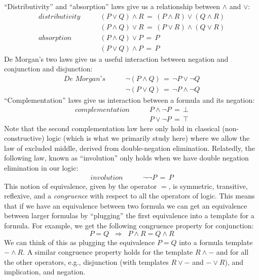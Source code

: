\noindent
``Distributivity'' and ``absorption'' laws give us a relationship
between $\wedge$ and $\vee$:
%
\begin{align*}
\textit{distributivity} \qquad & (P \vee Q) \wedge R \, = \, (P \wedge R) \vee (Q \wedge R) \\
 & (P \wedge Q) \vee R \, = \, (P \vee R) \wedge (Q
                                               \vee R) \\
  \textit{absorption} \qquad & (P \wedge Q) \vee P \, = \, P \\
   & (P \vee Q) \wedge P \, = \, P
\end{align*}
%
De Morgan's two laws give us a useful interaction between negation and
conjunction and disjunction:
%
\begin{align*}
\textit{De Morgan's} \qquad & \neg (P \wedge Q) \, = \, \neg P \vee \neg Q \\
& \neg (P \vee Q) \, = \, \neg P \wedge \neg Q
\end{align*}
%
``Complementation'' laws give us interaction between a formula and its
negation:
%
\begin{align*}
  \textit{complementation} \qquad  & P \wedge \neg P \, = \, \bot \\
  & P \vee \neg P \, = \, \top
\end{align*}
%
Note that the second complementation law here only hold in classical
(non-constructive) logic (which is what we primarily study here) where we
allow the law of excluded middle, derived from double-negation
elimination. Relatedly, the following law, known as ``involution''
only holds when we have double negation elimination in our logic:
%
\begin{align*}
\textit{involution} \qquad & \neg\neg P \, = \, P
\end{align*}
%
This notion of equivalence, given by the operator $=$, is symmetric,
transitive, reflexive, and a
\emph{congruence} with respect to all the operators of
logic. This means that if we have an equivalence between two formula
we can get an equivalence between larger formulas by
``plugging'' the first equivalence into a template for a formula.
For example, we get the following congruence property for conjunction:
%
\begin{equation*}
P = Q \;\; \Rightarrow \;\; P \wedge R = Q \wedge R
\end{equation*}
%
We can think of this as plugging the equivalence $P = Q$ into a
formula template $- \wedge R$. A similar congruence property holds for
the template $R \wedge -$ and for all the other operators, e.g.,
disjunction (with templates $R \vee -$ and $- \vee R$), and
implication, and negation.

